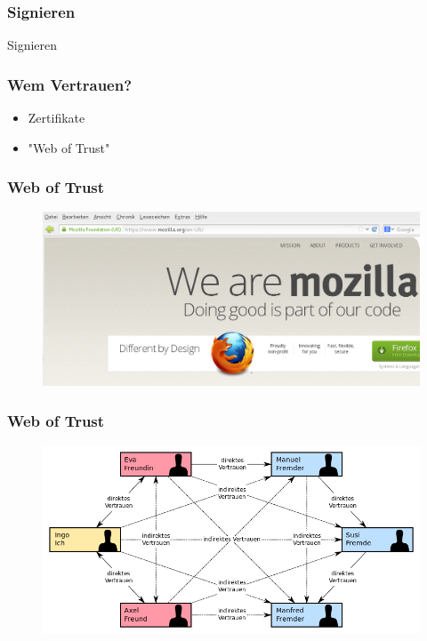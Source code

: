 \documentclass[12pt]{beamer}
\begin{document}
\begin{frame}
\frametitle{Signieren}
\begin{center}\Large
Signieren
\end{center}
\end{frame}

\begin{frame}
\frametitle{Wem Vertrauen?}
\begin{itemize}[<+->]
  \item Zertifikate
  \item "Web of Trust"
\end{itemize}
\end{frame}

\begin{frame}
\frametitle{Web of Trust}
\begin{figure}
  \includegraphics[height=0.7\textheight]{img/ssl.png}
\end{figure}
\end{frame}

\begin{frame}
\frametitle{Web of Trust}
\begin{figure}
  \includegraphics[height=0.7\textheight]{img/weboftrust.png}
\end{figure}
\end{frame}
\end{document}
